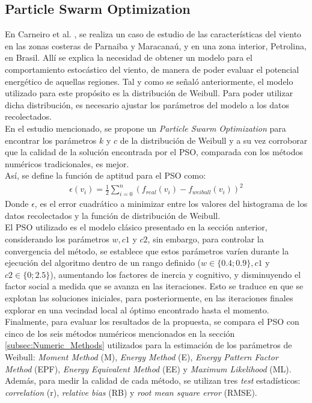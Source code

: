  \subsection{Particle Swarm Optimization}
 En Carneiro et al. \cite{Carneiro15}, se realiza un caso de estudio de las características del viento en las zonas costeras de Parnaiba y Maracanaú, y en una zona interior, Petrolina, en Brasil. Allí se explica la necesidad de obtener un modelo para el comportamiento estocástico del viento, de manera de poder evaluar el potencial energético de aquellas regiones. Tal y como se señaló anteriormente, el modelo utilizado para este propósito es la distribución de Weibull. Para poder utilizar dicha distribución, es necesario ajustar los parámetros del modelo a los datos recolectados.\\
 En el estudio mencionado, se propone un \emph{Particle Swarm Optimization} para encontrar los parámetros $k$ y $c$ de la distribución de Weibull y a su vez corroborar que la calidad de la solución encontrada por el PSO, comparada con los métodos numéricos tradicionales, es mejor.\\
 Así, se define la función de aptitud para el PSO como:
\begin{align}\label{eq:PSO_FO}
    \epsilon(v_i) = \frac{1}{2}\sum_{i=0}^{n}(f_{real}(v_i) - f_{weibull}(v_i))^2
\end{align}
Donde $\epsilon$, es el error cuadrático a minimizar entre los valores del histograma de los datos recolectados y la función de distribución de Weibull.\\
El PSO utilizado es el modelo clásico presentado en la sección anterior, considerando los parámetros $w, c1$ y $c2$, sin embargo, para controlar la convergencia del método, se establece que estos parámetros varíen durante la ejecución del algoritmo dentro de un rango definido ($w \in \{0.4; 0.9\}, c1$ y $c2 \in \{0; 2.5\}$), aumentando los factores de inercia y cognitivo, y disminuyendo el factor social a medida que se avanza en las iteraciones. Esto se traduce en que se explotan las soluciones iniciales, para posteriormente, en las iteraciones finales explorar en una vecindad local al óptimo encontrado hasta el momento.\\
Finalmente, para evaluar los resultados de la propuesta, se compara el PSO con cinco de los seis métodos numéricos mencionados en la sección \ref{subsec:Numeric_Methods} utilizados para la estimación de los parámetros de Weibull: \emph{Moment Method} (M), \emph{Energy Method} (E), \emph{Energy Pattern Factor Method} (EPF), \emph{Energy Equivalent Method} (EE) y \emph{Maximum Likelihood} (ML). Además, para medir la calidad de cada método, se utilizan tres \emph{test} estadísticos: \emph{correlation} (r), \emph{relative bias} (RB) y \emph{root mean square error} (RMSE).\\
